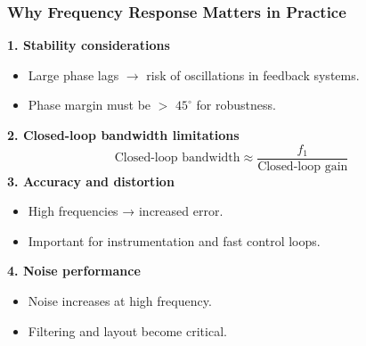 \begin{frame}
	\frametitle{Why Frequency Response Matters in Practice}
	\small
	\textbf{1. Stability considerations}
	\begin{itemize}
		\item Large phase lags $\rightarrow$ risk of oscillations in feedback systems.
		\item Phase margin must be $>$ $45^\circ$ for robustness.
	\end{itemize}
	\textbf{2. Closed-loop bandwidth limitations}
	\begin{equation}
		\text{Closed-loop bandwidth} \approx \frac{f_1}{\text{Closed-loop gain}}
	\end{equation}
	\textbf{3. Accuracy and distortion}
	\begin{itemize}
		\item High frequencies → increased error.
		\item Important for instrumentation and fast control loops.
	\end{itemize}
	\textbf{4. Noise performance}
	\begin{itemize}
		\item Noise increases at high frequency.
		\item Filtering and layout become critical.
	\end{itemize}
\end{frame}
